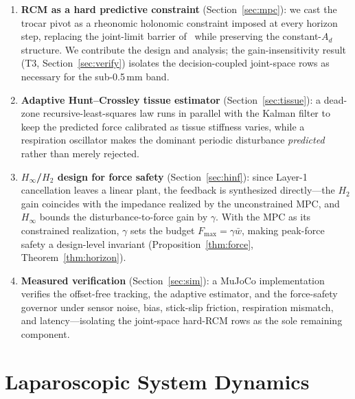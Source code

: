 \begin{enumerate}
\item \textbf{RCM as a hard predictive constraint} (Section~\ref{sec:mpc}): we cast the trocar pivot as a rheonomic holonomic constraint imposed at every horizon step, replacing the joint-limit barrier of~\cite{cao2026phri} while preserving the constant-$A_d$ structure. We contribute the design and analysis; the gain-insensitivity result (T3, Section~\ref{sec:verify}) isolates the decision-coupled joint-space rows as necessary for the sub-0.5\,mm band.
\item \textbf{Adaptive Hunt--Crossley tissue estimator} (Section~\ref{sec:tissue}): a dead-zone recursive-least-squares law runs in parallel with the Kalman filter to keep the predicted force calibrated as tissue stiffness varies, while a respiration oscillator makes the dominant periodic disturbance \emph{predicted} rather than merely rejected.
\item \textbf{$H_\infty$/$H_2$ design for force safety} (Section~\ref{sec:hinf}): since Layer-1 cancellation leaves a linear plant, the feedback is synthesized directly---the $H_2$ gain coincides with the impedance realized by the unconstrained MPC, and $H_\infty$ bounds the disturbance-to-force gain by $\gamma$. With the MPC as its constrained realization, $\gamma$ sets the budget $F_{\max}=\gamma\bar w$, making peak-force safety a design-level invariant (Proposition~\ref{thm:force}, Theorem~\ref{thm:horizon}).
\item \textbf{Measured verification} (Section~\ref{sec:sim}): a MuJoCo implementation verifies the offset-free tracking, the adaptive estimator, and the force-safety governor under sensor noise, bias, stick-slip friction, respiration mismatch, and latency---isolating the joint-space hard-RCM rows as the sole remaining component.
\end{enumerate}

\section{Laparoscopic System Dynamics}\label{sec:dynamics}

